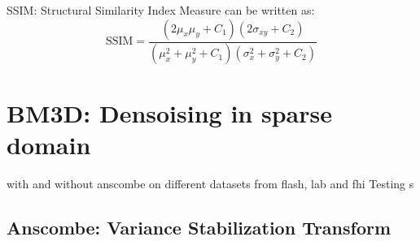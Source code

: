SSIM: Structural Similarity Index Measure can be written as:
\begin{equation}
    \text{SSIM} = \frac{(2\mu_x\mu_y + C_1)(2\sigma_{xy} + C_2)}{(\mu_x^2 + \mu_y^2 + C_1)(\sigma_x^2 + \sigma_y^2 + C_2)}
\end{equation}

\section{BM3D: Densoising in sparse domain}
with and without anscombe on different datasets from flash, lab and fhi
Testing s
\subsection{Anscombe: Variance Stabilization Transform}
